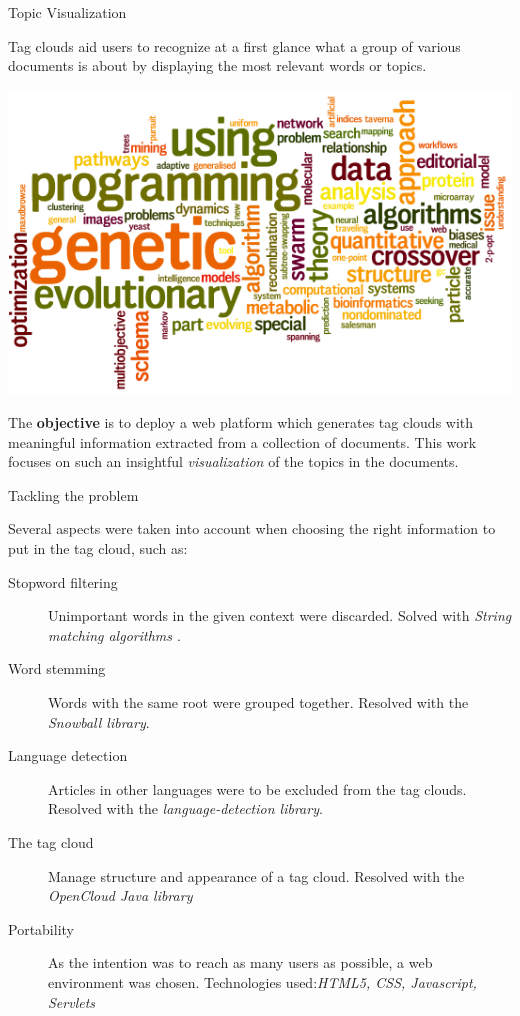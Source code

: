 \documentclass[a0paper, portrait]{baposter}
\begin{document}
\begin{poster}

  \begin{posterbox}[name=intro, column=0, row=0]{Topic Visualization} {
    Tag clouds aid users to recognize at a first glance what a group of various documents is about by displaying the most relevant words or topics.
    
    \includegraphics[width=\linewidth]{wordle2.png}
    \label{fig:1}
    
    \vspace{1em}The {\bf objective} is to deploy a web platform which generates tag clouds with meaningful information extracted from a collection of documents. This work focuses on such an insightful {\em visualization} of the topics in the documents. %
  }
  \end{posterbox}

  \begin{posterbox}[name=tech, column=0, below=intro]{Tackling the problem} {
    Several aspects were taken into account when choosing the right information to put in the tag cloud, such as: \newline
    \begin{description}
    \item[Stopword filtering] Unimportant words in the given context were discarded. Solved with {\em String matching algorithms \cite{Charras}}. 
    \item[Word stemming] Words with the same root were grouped together. Resolved with the {\em Snowball \cite{Porter} library}.
    \item[Language detection] Articles in other languages were to be excluded from the tag clouds. Resolved with the {\em language-detection \cite{Nakatani} library}.
    \item[The tag cloud] Manage structure and appearance of a tag cloud. Resolved with the {\em OpenCloud \cite{Mcavallo} Java library} 
    \item[Portability] As the intention was to reach as many users as possible, a web environment was chosen. Technologies used:{\em HTML5, CSS, Javascript, Servlets} 
    \end{description}
  }
  \end{posterbox}


\end{poster}
\end{document}

